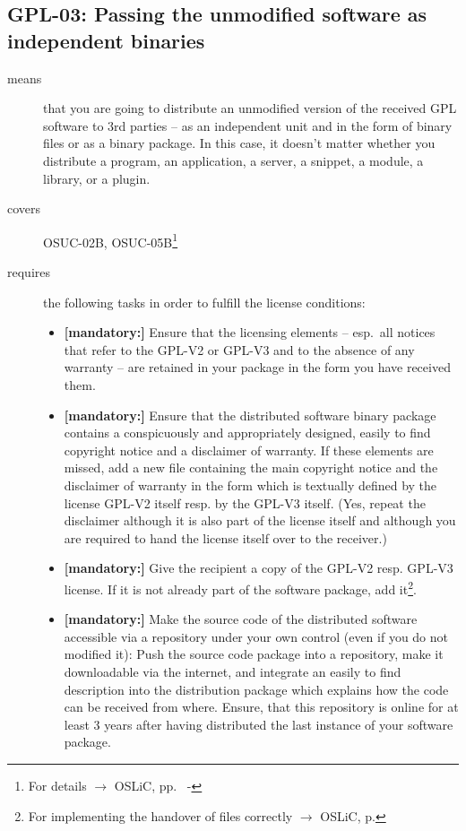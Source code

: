 \subsection{GPL-03: Passing the unmodified software as independent binaries} 
\label{OSUC-02B-GPL} \label{OSUC-05B-GPL}

\begin{description}


\item[means] that you are going to distribute an unmodified version of the
received GPL software to 3rd parties -- as an independent unit and in the form
of binary files or as a binary package. In this case, it doesn't matter whether
you distribute a program, an application, a server, a snippet, a module, a
library, or a plugin.


\item[covers] OSUC-02B, OSUC-05B\footnote{For details $\rightarrow$ OSLiC, pp.\
\pageref{OSUC-02B-DEF} - \pageref{OSUC-05B-DEF}}

\item[requires] the following tasks in order to fulfill the license conditions:
\begin{itemize}
  
  \item \textbf{[mandatory:]} Ensure that the licensing elements -- esp.\ all
  notices that refer to the GPL-V2 or GPL-V3 and to the absence of any
  warranty -- are retained in your package in the form you have received them.

  \item \textbf{[mandatory:]} Ensure that the distributed software binary
  package contains a conspicuously and appropriately designed, easily to find
  copyright notice and a disclaimer of warranty. If these elements are missed,
  add a new file containing the main copyright notice and the disclaimer of
  warranty in the form which is textually defined by the license GPL-V2 itself
  resp. by the GPL-V3 itself. (Yes, repeat the disclaimer although it is also
  part of the license itself and although you are required to hand the license
  itself over to the receiver.)
  
  \item \textbf{[mandatory:]} Give the recipient a copy of the GPL-V2 resp.
  GPL-V3 license. If it is not already part of the software package, add
  it\footnote{For implementing the handover of files correctly $\rightarrow$
  OSLiC, p. \pageref{DistributingFilesHint}}.
  
  \item \textbf{[mandatory:]} Make the source code of the distributed software
  accessible via a repository under your own control (even if you do not
  modified it): Push the source code package into a repository, make it
  downloadable via the internet, and integrate an easily to find description
  into the distribution package which explains how the code can be received from
  where. Ensure, that this repository is online for at least 3 years after
  having distributed the last instance of your software package.
  

\end{itemize}
\end{description}
